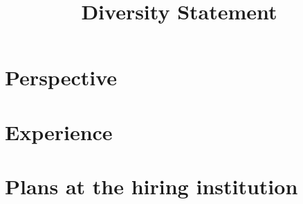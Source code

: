 \documentclass[11pt,letterpaper]{article}
\title{Diversity Statement}
\author{\docauthor}
\date{}
\begin{document}
\maketitle
\thispagestyle{empty}

\section*{Perspective}

\section*{Experience}

\section*{Plans at the hiring institution}
\end{document}

